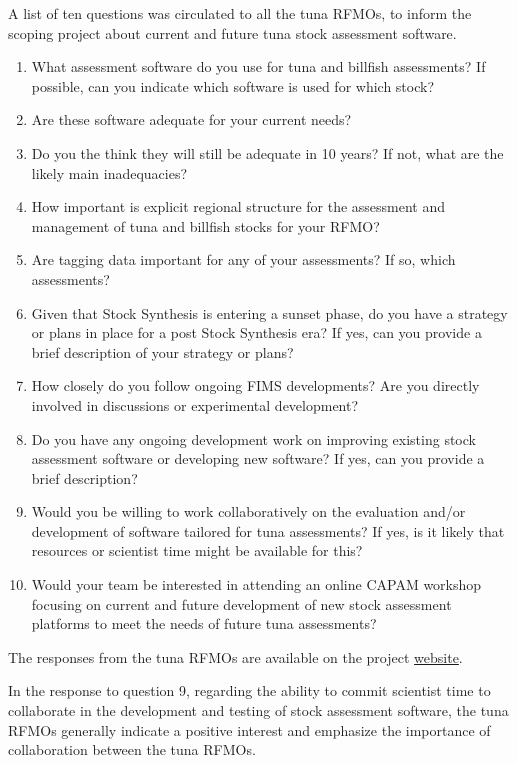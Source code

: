 \documentclass{SCreport}
\newcommand\tree
{https://github.com/PacificCommunity/ofp-sam-transition-plan/tree/main}
\begin{document}
A list of ten questions was circulated to all the tuna RFMOs, to inform the
scoping project about current and future tuna stock assessment software.

\begin{enumerate}
  \item What assessment software do you use for tuna and billfish assessments?
  If possible, can you indicate which software is used for which stock?
  \item Are these software adequate for your current needs?
  \item Do you the think they will still be adequate in 10 years? If not, what
  are the likely main inadequacies?
  \item How important is explicit regional structure for the assessment and
  management of tuna and billfish stocks for your RFMO?
  \item Are tagging data important for any of your assessments? If so, which
  assessments?
  \item Given that Stock Synthesis is entering a sunset phase, do you have a
  strategy or plans in place for a post Stock Synthesis era? If yes, can you
  provide a brief description of your strategy or plans?
  \item How closely do you follow ongoing FIMS developments? Are you directly
  involved in discussions or experimental development?
  \item Do you have any ongoing development work on improving existing stock
  assessment software or developing new software? If yes, can you provide a
  brief description?
  \item Would you be willing to work collaboratively on the evaluation and/or
  development of software tailored for tuna assessments? If yes, is it likely
  that resources or scientist time might be available for this?
  \item Would your team be interested in attending an online CAPAM workshop
  focusing on current and future development of new stock assessment platforms
  to meet the needs of future tuna assessments?
\end{enumerate}

\vspace{2ex}

The responses from the tuna RFMOs are available on the project
\href{\tree/notes/rfmo_discussion/feedback}{website}.

In the response to question 9, regarding the ability to commit scientist time to
collaborate in the development and testing of stock assessment software, the
tuna RFMOs generally indicate a positive interest and emphasize the importance
of collaboration between the tuna RFMOs.
\end{document}
